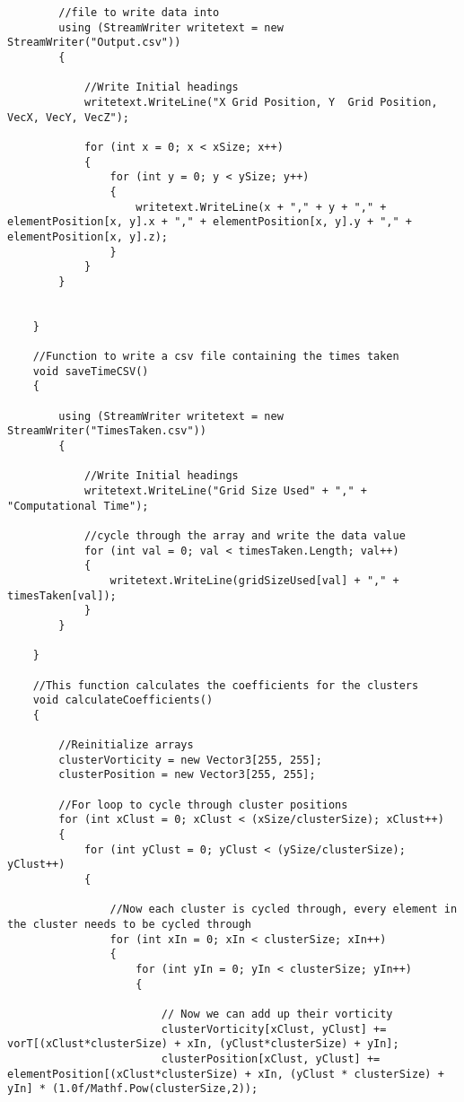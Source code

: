 \begin{mdframed}[linecolor=black, topline=true, bottomline=true,
  leftline=false, rightline=false]
\begin{verbatim}
        //file to write data into
        using (StreamWriter writetext = new StreamWriter("Output.csv"))
        {

            //Write Initial headings
            writetext.WriteLine("X Grid Position, Y  Grid Position, VecX, VecY, VecZ");

            for (int x = 0; x < xSize; x++)
            {
                for (int y = 0; y < ySize; y++)
                {
                    writetext.WriteLine(x + "," + y + "," + elementPosition[x, y].x + "," + elementPosition[x, y].y + "," + elementPosition[x, y].z);
                }
            }
        }


    }

    //Function to write a csv file containing the times taken
    void saveTimeCSV()
    {

        using (StreamWriter writetext = new StreamWriter("TimesTaken.csv"))
        {

            //Write Initial headings
            writetext.WriteLine("Grid Size Used" + "," + "Computational Time");

            //cycle through the array and write the data value
            for (int val = 0; val < timesTaken.Length; val++)
            {
                writetext.WriteLine(gridSizeUsed[val] + "," + timesTaken[val]);
            }
        }

    }

    //This function calculates the coefficients for the clusters
    void calculateCoefficients()
    {

        //Reinitialize arrays
        clusterVorticity = new Vector3[255, 255];
        clusterPosition = new Vector3[255, 255];

        //For loop to cycle through cluster positions
        for (int xClust = 0; xClust < (xSize/clusterSize); xClust++)
        {
            for (int yClust = 0; yClust < (ySize/clusterSize); yClust++)
            {

                //Now each cluster is cycled through, every element in the cluster needs to be cycled through
                for (int xIn = 0; xIn < clusterSize; xIn++)
                {
                    for (int yIn = 0; yIn < clusterSize; yIn++)
                    {

                        // Now we can add up their vorticity
                        clusterVorticity[xClust, yClust] += vorT[(xClust*clusterSize) + xIn, (yClust*clusterSize) + yIn];
                        clusterPosition[xClust, yClust] += elementPosition[(xClust*clusterSize) + xIn, (yClust * clusterSize) + yIn] * (1.0f/Mathf.Pow(clusterSize,2));


\end{verbatim}
\end{mdframed}
